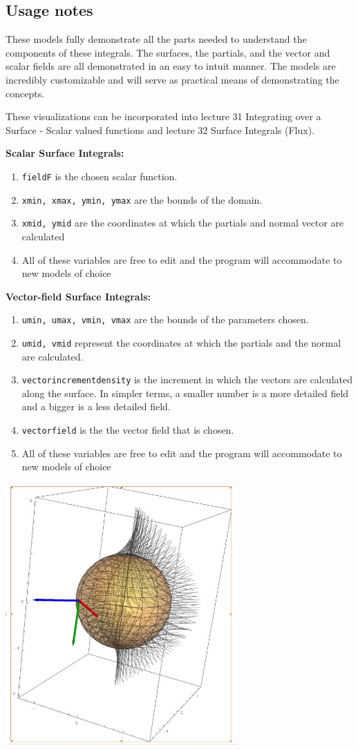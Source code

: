 \subsection*{Usage notes}

These models fully demonstrate all the parts needed to understand the components of these integrals. The surfaces, the partials, and the vector and scalar fields are all demonstrated in an easy to intuit manner. The models are incredibly customizable and will serve as practical means of demonstrating the concepts. 

These visualizations can be incorporated into lecture 31 Integrating over a Surface - Scalar valued functions and lecture 32 Surface Integrals (Flux).

\textbf{Scalar Surface Integrals:}
\begin{enumerate}
\item \verb+fieldF+ is the chosen scalar function.
\item \verb+xmin, xmax, ymin, ymax+ are the bounds of the domain.
\item \verb+xmid, ymid+ are the coordinates at which the partials and normal vector are calculated
\item All of these variables are free to edit and the program will accommodate to new models of choice
\end{enumerate}

\textbf{Vector-field Surface Integrals:}
\begin{enumerate}
\item \verb+umin, umax, vmin, vmax+ are the bounds of the parameters chosen. 
\item \verb+umid, vmid+ represent the coordinates at which the partials and the normal are calculated.
\item \verb+vectorincrementdensity+ is the increment in which the vectors are calculated along the surface. In simpler terms, a smaller number is a more detailed field and a bigger is a less detailed field. 
\item \verb+vectorfield+ is the the vector field that is chosen. 
\item All of these variables are free to edit and the program will accommodate to new models of choice
\end{enumerate}

\includegraphics[height=10cm]{../exhibit/flux.jpg}

